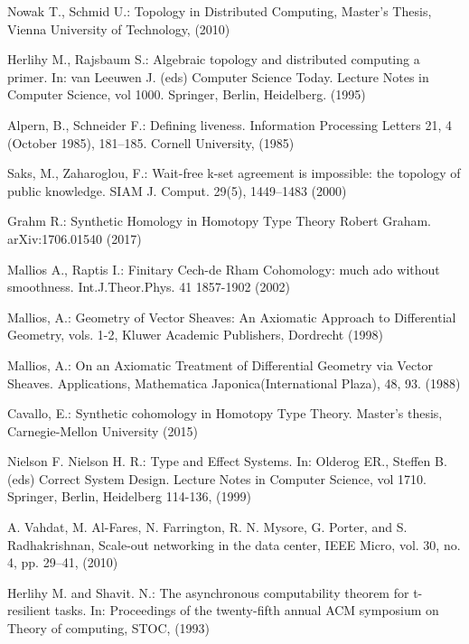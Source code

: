 \documentclass[runningheads]{llncs}
\begin{document}
\begin{thebibliography}{8}
Nowak T., Schmid U.: Topology in Distributed Computing, Master's Thesis, Vienna University of Technology, (2010)

Herlihy M., Rajsbaum S.: Algebraic topology and distributed computing a primer. In: van Leeuwen J. (eds) Computer Science Today. Lecture Notes in Computer Science, vol 1000. Springer, Berlin, Heidelberg. (1995)

Alpern, B., Schneider F.: Defining liveness. Information Processing Letters 21, 4 (October 1985), 181--185. Cornell University, (1985)

Saks, M., Zaharoglou, F.: Wait-free k-set agreement is impossible: the topology of public knowledge. SIAM J. Comput. 29(5), 1449–1483 (2000)

Grahm R.: Synthetic Homology in Homotopy Type Theory Robert Graham. arXiv:1706.01540 (2017)

Mallios A., Raptis I.: Finitary Cech-de Rham Cohomology: much ado without smoothness. Int.J.Theor.Phys. 41 1857-1902 (2002)

Mallios, A.: Geometry of Vector Sheaves: An Axiomatic Approach to Differential Geometry, vols. 1-2, Kluwer Academic Publishers, Dordrecht (1998)

Mallios, A.: On an Axiomatic Treatment of Differential Geometry via Vector Sheaves. Applications, Mathematica Japonica(International Plaza), 48, 93. (1988)

Cavallo, E.: Synthetic cohomology in Homotopy Type Theory. Master’s thesis, Carnegie-Mellon University (2015)

Nielson F. Nielson H. R.: Type and Effect Systems. In: Olderog ER., Steffen B. (eds) Correct System Design. Lecture Notes in Computer Science, vol 1710. Springer, Berlin, Heidelberg 114-136, (1999)

A. Vahdat, M. Al-Fares, N. Farrington, R. N. Mysore, G. Porter, and S. Radhakrishnan, Scale-out networking in the data center, IEEE Micro, vol. 30, no. 4, pp. 29–41, (2010) 

Herlihy M. and Shavit. N.: The asynchronous computability theorem for t-resilient tasks. In: Proceedings of the twenty-fifth annual ACM symposium on Theory of computing, STOC, (1993)


\end{thebibliography}
\end{document}
